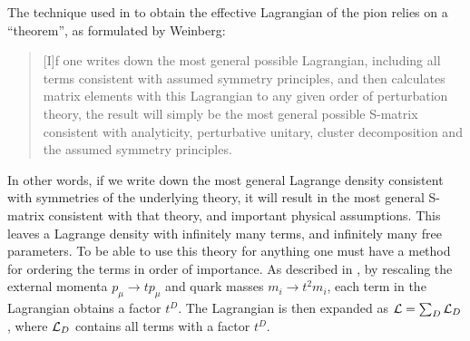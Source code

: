 The technique used in \chpt to obtain the effective Lagrangian of the pion relies on a ``theorem'', as formulated by Weinberg:
\begin{quote}
    [I]f one writes down the most general possible Lagrangian, including all terms consistent with assumed symmetry principles, and then calculates matrix elements with this Lagrangian to any given order of perturbation theory, the result will simply be the most general possible S-matrix consistent with analyticity, perturbative unitary, cluster decomposition and the assumed symmetry principles. \cite{WeinbergPhenom}
\end{quote}
In other words, if we write down the most general Lagrange density consistent with symmetries of the underlying theory, it will result in the most general S-matrix consistent with that theory, and important physical assumptions.
This leaves a Lagrange density with infinitely many terms, and infinitely many free parameters.
To be able to use this theory for anything one must have a method for ordering the terms in order of importance.
As described in \cite{Scherer2002IntroductionTC}, by rescaling the external momenta $p_\mu \rightarrow t p_\mu$ and quark masses $m_i \rightarrow t^2 m_i$, each term in the Lagrangian obtains a factor $t^D$.
The Lagrangian is then expanded as $\mathcal{L} = \sum_D \mathcal{L}_D$, where $\mathcal{L}_D$ contains all terms with a factor $t^D$.

